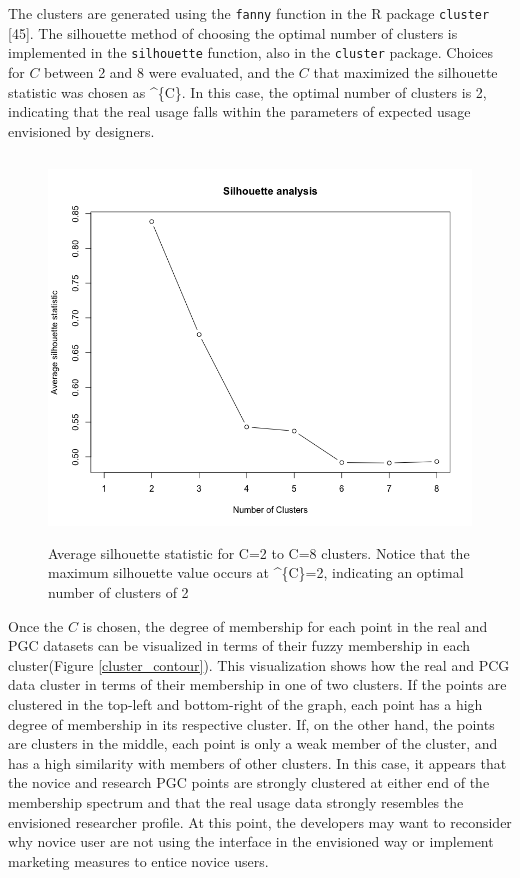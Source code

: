 \documentclass[]{article}
\begin{document}
The clusters are generated using the \texttt{fanny} function in the R
package \texttt{cluster} {[}45{]}. The silhouette method of choosing the
optimal number of clusters is implemented in the \texttt{silhouette}
function, also in the \texttt{cluster} package. Choices for \(C\)
between 2 and 8 were evaluated, and the \(C\) that maximized the
silhouette statistic was chosen as \^{}\{C\}. In this case, the optimal
number of clusters is 2, indicating that the real usage falls within the
parameters of expected usage envisioned by designers.

\begin{figure}[htbp]
\centering
\includegraphics[height=4.00000in]{./silhouette.png}
\caption{Average silhouette statistic for C=2 to C=8 clusters. Notice
that the maximum silhouette value occurs at \^{}\{C\}=2, indicating an
optimal number of clusters of 2 \label{silhouette_scree}}
\end{figure}

Once the \(C\) is chosen, the degree of membership for each point in the
real and PGC datasets can be visualized in terms of their fuzzy
membership in each cluster(Figure \ref{cluster_contour}). This
visualization shows how the real and PCG data cluster in terms of their
membership in one of two clusters. If the points are clustered in the
top-left and bottom-right of the graph, each point has a high degree of
membership in its respective cluster. If, on the other hand, the points
are clusters in the middle, each point is only a weak member of the
cluster, and has a high similarity with members of other clusters. In
this case, it appears that the novice and research PGC points are
strongly clustered at either end of the membership spectrum and that the
real usage data strongly resembles the envisioned researcher profile. At
this point, the developers may want to reconsider why novice user are
not using the interface in the envisioned way or implement marketing
measures to entice novice users.
\end{document}
